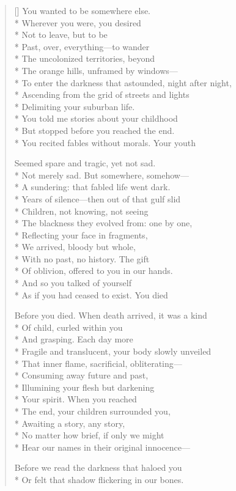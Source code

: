 \label{ch:deathinlife}
\settowidth{\versewidth}{To enter the darkness that astounded, night after night,}
\begin{verse}[\versewidth]
You wanted to be somewhere else.\\*
Wherever you were, you desired\\*
Not to leave, but to be\\*
Past, over, everything---to wander\\*
The uncolonized territories, beyond \\*
The orange hills, unframed by windows---\\*
To enter the darkness that astounded, night after night,\\*
Ascending from the grid of streets and lights\\*
Delimiting your suburban life.\\*
You told me stories about your childhood\\*
But stopped before you reached the end.\\*
You recited fables without morals.  Your youth

Seemed spare and tragic, yet not sad.\\*
Not merely sad.  But somewhere, somehow---\\*
A sundering: that fabled life went dark.\\*
Years of silence---then out of that gulf slid\\*
Children, not knowing, not seeing\\*
The blackness they evolved from: one by one,\\*
Reflecting your face in fragments,\\*
We arrived, bloody but whole,\\*
With no past, no history.  The gift\\*
Of oblivion, offered to you in our hands.\\*
And so you talked of yourself\\*
As if you had ceased to exist.	You died

Before you died.   When death arrived, it was a kind\\*
Of child, curled within you\\*
And grasping.   Each day more\\*
Fragile and translucent, your body slowly unveiled\\*
That inner flame, sacrificial, obliterating---\\*
Consuming away future and past, \\*
Illumining your flesh but darkening\\*
Your spirit. When you reached\\*
The end, your children surrounded you,\\*
Awaiting a story, any story,\\*
No matter how brief, if only we might\\*
Hear our names in their original innocence---

Before we read the darkness that haloed you\\*
Or felt that shadow flickering in our bones.
\end{verse}
